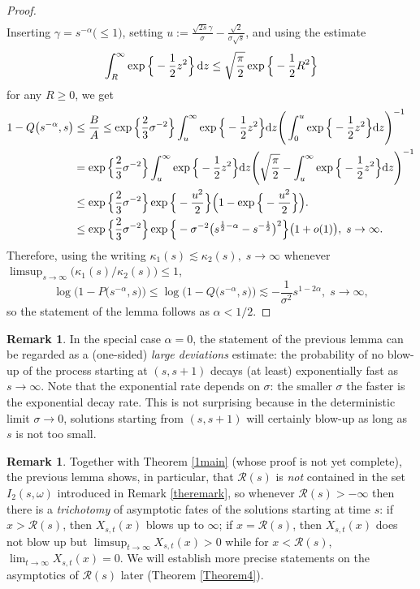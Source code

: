 \documentclass[sn-mathphys-num]{sn-jnl}
\theoremstyle{definition}
\newtheorem{rem}[thm]{Remark}
\newcommand{\scr}[1]{\mathscr #1}
\numberwithin{equation}{section} \theoremstyle{remark}
\renewcommand{\d}{\hbox{d}}
\def\d{\text{\rm{d}}} \def\bb{\beta} \def\aa{\alpha} \def\D{\scr D}
\def\RR{\mathscr R}
\newcommand{\1}{\mathbbm{1}}
\begin{document}
\begin{proof}
\begin{align*}
\end{align*}
Inserting $\gamma=s^{-\alpha}\big(\leq 1\big)$, setting $u:=\frac{\sqrt{2s}\gamma}\sigma -\frac{\sqrt 2}{\sigma \sqrt s}$,  and using the estimate
$$
\int_R^{\infty}\exp\Big\{ -\frac 12 z^2   \Big\}\,\d z \leq \sqrt{\frac \pi 2} \exp\Big\{-\frac 12 R^2\Big\}
$$ 
for any $R \geq 0$, we get
\begin{align*}
  1-Q\big( s^{-\alpha},s\big)&\leq \frac BA \leq \exp\Big\{\frac 23 \sigma^{-2}\Big\} \int_u^{\infty} \exp\Big\{ -\frac 12 z^2   \Big\}\d z\Bigg(\int_0^u \exp\Big\{ -\frac 12 z^2   \Big\}\d z\Bigg)^{-1}\\
  &= \exp\Big\{\frac 23 \sigma^{-2}\Big\} \int_u^{\infty} \exp\Big\{ -\frac 12 z^2   \Big\}\d z\Bigg(\sqrt{\frac \pi 2}-\int_u^\infty \exp\Big\{ -\frac 12 z^2   \Big\}\d z\Bigg)^{-1}\\
  &\leq  \exp\Big\{\frac 23 \sigma^{-2}\Big\} \exp\Big\{-\frac {u^2}2   \Big\}  \Big(1- \exp\Big\{-\frac {u^2}2   \Big\} \Big).\\
                             &\leq  \exp\Big\{\frac 23 \sigma^{-2}\Big\} \exp\Big\{-\sigma^{-2}\big( s^{\frac 12-\alpha}-s^{-\frac 12}\big)^2\Big\}\big(1+o(1)\big),\;s \to \infty.
\end{align*}
Therefore, using the writing $\kappa_1(s)\lesssim \kappa_2(s),\;s \to \infty$ whenever $\limsup_{s \to \infty}\Big(\kappa_1(s)/\kappa_2(s)\Big)\leq 1$,
$$
\log\big(1-P\big(s^{-\alpha},s\big)\big)\leq \log\big(1-Q\big(s^{-\alpha},s\big)\big)\lesssim -\frac 1{\sigma^2}s^{1-2\alpha}, \; s \to \infty,
$$
so the statement of the lemma follows as $\alpha<1/2$.
\end{proof}

\begin{rem}
  In the special case $\alpha=0$, the statement of the previous lemma can be regarded as a (one-sided) {\em large deviations} estimate: the  probability of no blow-up of the process
  starting at $(s,s+1)$ decays (at least) exponentially fast as $s \to \infty$. Note that the exponential rate depends on $\sigma$: the smaller $\sigma$ the faster is the exponential
  decay rate. This is not surprising because in the deterministic limit $\sigma \to 0$, solutions starting from $(s,s+1)$ will certainly blow-up as long as $s$ is not too small.
\end{rem}

\begin{rem}
Together with Theorem \ref{1main} (whose proof is not yet complete), the previous lemma shows, in particular, that $\RR(s)$ is {\em not} contained in the set $I_2(s,\omega)$ introduced in Remark \ref{theremark}, so whenever $\RR(s)>-\infty$ then there is a {\em trichotomy} of asymptotic fates of the solutions starting at time $s$: if $x>\RR(s)$, then $X_{s,t}(x)$ blows up to $\infty$; if $x=\RR(s)$, then $X_{s,t}(x)$ does not blow up but $\limsup_{t \to \infty} X_{s,t}(x)>0$ while for $x<\RR(s)$, $\lim_{t \to \infty}X_{s,t}(x)=0$. We will establish more precise statements on the asymptotics of $\RR(s)$ later (Theorem \ref{Theorem4}).  
  \end{rem}
  
\end{document}
